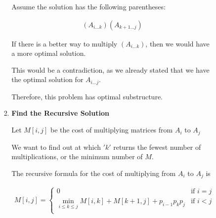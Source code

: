 \documentclass[12pt]{article}
\begin{document}
\begin{enumerate}[1.]
\begin{itemize}
\begin{itemize}
\begin{enumerate}[1.]
                \bigskip

                Assume the solution has the following parentheses:

                \begin{align*}
                    (A_{i...k})(A_{k+1...j})
                \end{align*}

                \bigskip

                If there is a better way to multiply $(A_{i...k})$, then we
                would have a more optimal solution.

                \bigskip

                This would be a contradiction, as we already stated that we have the optimal
                solution for $A_{i...j}$.

                \bigskip

                Therefore, this problem has optimal substructure.

                \bigskip


                \item \textbf{Find the Recursive Solution}

                \bigskip

                Let $M[i,j]$ be the cost of multiplying matrices from $A_i$ to $A_j$

                \bigskip

                We want to find out at which $'k'$ returns the fewest number of multiplications,
                or the minimum number of $M$.

                \bigskip

                The recursive formula for the cost of multiplying from $A_i$ to $A_j$ is

                \begin{align}
                    M[i,j] = \begin{cases}
                        0 & \text{if $i = j$}\\
                        \min_{i \leq k \leq j} M[i,k] + M[k+1,j] + p_{i-1}p_{k}p_j & \text{if $i < j$}\\
                    \end{cases}
                \end{align}


\end{enumerate}
\end{itemize}
\end{itemize}
\end{enumerate}
\end{document}
